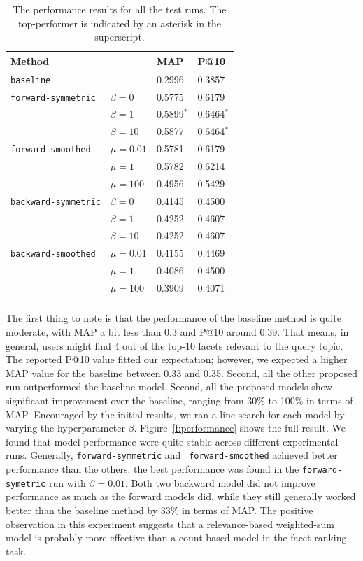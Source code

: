 \begin{table}[ht!]
  \centering
  \begin{tabular}{llll}
    Method & & MAP & P@10 \\
    \hline
    {\tt baseline} & & 0.2996 & 0.3857 \\
    {\tt forward-symmetric} & $\beta = 0$ & 0.5775 & 0.6179\\
    & $\beta = 1$ & 0.5899$^*$ & 0.6464$^*$ \\
    & $\beta = 10$ & 0.5877 & 0.6464$^*$ \\
    {\tt forward-smoothed} & $\mu = 0.01$ & 0.5781 & 0.6179 \\
    & $\mu = 1$ & 0.5782 & 0.6214 \\
    & $\mu = 100$ & 0.4956 & 0.5429 \\
    {\tt backward-symmetric} & $\beta = 0$ & 0.4145 & 0.4500\\
    & $\beta = 1$ & 0.4252 & 0.4607\\
    & $\beta = 10$ & 0.4252 & 0.4607\\
    {\tt backward-smoothed} & $\mu = 0.01$ & 0.4155 & 0.4469 \\
    & $\mu = 1$ & 0.4086 & 0.4500 \\
    & $\mu = 100$ & 0.3909 & 0.4071 \\
    \\
  \end{tabular}
  \caption{The performance results for all the test runs.  The top-performer is indicated by an asterisk in the superscript.}
  \label{t:performance}
\end{table}

The first thing to note is that the performance of the baseline method is quite
moderate, with MAP a bit less than 0.3 and P@10 around 0.39.  That means, in
general, users might find 4 out of the top-10 facets relevant to the query
topic.  The reported P@10 value fitted our expectation; however, we expected a
higher MAP value for the baseline between 0.33 and 0.35.  Second, all the other
proposed run outperformed the baseline model.  Second, all the proposed models
show significant improvement over the baseline, ranging from 30\% to 100\% in
terms of MAP.  Encouraged by the initial results, we ran a line search for each
model by varying the hyperparameter $\beta$.  Figure~\ref{f:performance} shows
the full result.  We found that model performance were quite stable across
different experimental runs.  Generally, {\tt forward-symmetric} and {\tt
forward-smoothed} achieved better performance than the others; the best
performance was found in the {\tt forward-symetric} run with $\beta = 0.01$.
Both two backward model did not improve performance as much as the forward
models did, while they still generally worked better than the baseline method
by 33\% in terms of MAP.  The positive observation in this experiment suggests
that a relevance-based weighted-sum model is probably more effective than a
count-based model in the facet ranking task.  

